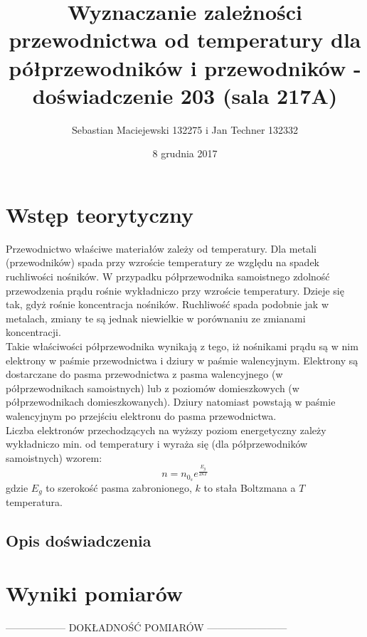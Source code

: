 \documentclass[10pt,a4paper]{article}
\author{Sebastian Maciejewski 132275 i Jan Techner 132332}
\title{Wyznaczanie zależności przewodnictwa od temperatury 
dla półprzewodników i przewodników - \\ doświadczenie 203 (sala 217A)}
\date{8 grudnia 2017}
\newcommand{\forceindent}{\leavevmode{\parindent=3em\indent}}
\begin{document}
\maketitle
\section{Wstęp teorytyczny}
\forceindent Przewodnictwo właściwe materiałów zależy od temperatury. Dla metali (przewodników) spada przy wzroście temperatury ze względu na spadek ruchliwości nośników. W przypadku półprzewodnika samoistnego zdolność przewodzenia prądu rośnie wykładniczo przy wzroście temperatury. Dzieje się tak, gdyż rośnie koncentracja nośników. Ruchliwość spada podobnie jak w metalach, zmiany te są jednak niewielkie w porównaniu ze zmianami koncentracji.\\
Takie właściwości półprzewodnika wynikają z tego, iż nośnikami prądu są w nim elektrony w paśmie przewodnictwa i dziury w paśmie walencyjnym. Elektrony są dostarczane do pasma przewodnictwa z pasma walencyjnego (w półprzewodnikach samoistnych) lub z poziomów domieszkowych (w półprzewodnikach domieszkowanych). Dziury natomiast powstają w paśmie walencyjnym po przejściu elektronu do pasma przewodnictwa.\\
Liczba elektronów przechodzących na wyższy poziom energetyczny zależy wykładniczo min. od temperatury i wyraża się (dla półprzewodników samoistnych) wzorem:
\begin{equation}
n = n_{0_s} e^{\frac{E_g}{2kT}}
\end{equation}
gdzie $E_g$ to szerokość pasma zabronionego, $k$ to stała Boltzmana a $T$ temperatura.

\subsection*{Opis doświadczenia}



\newpage
\section{Wyniki pomiarów}

------------------ DOKŁADNOŚĆ POMIARÓW ------------------------ \\
\end{document}
